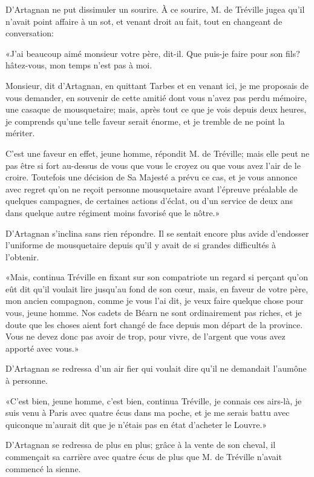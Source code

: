 D'Artagnan ne put dissimuler un sourire. À ce sourire, M. de Tréville jugea qu'il n'avait point affaire à un sot, et venant droit au fait, tout en changeant de conversation: 

«J'ai beaucoup aimé monsieur votre père, dit-il. Que puis-je faire pour son fils? hâtez-vous, mon temps n'est pas à moi. 

\speak  Monsieur, dit d'Artagnan, en quittant Tarbes et en venant ici, je me proposais de vous demander, en souvenir de cette amitié dont vous n'avez pas perdu mémoire, une casaque de mousquetaire; mais, après tout ce que je vois depuis deux heures, je comprends qu'une telle faveur serait énorme, et je tremble de ne point la mériter. 

\speak  C'est une faveur en effet, jeune homme, répondit M. de Tréville; mais elle peut ne pas être si fort au-dessus de vous que vous le croyez ou que vous avez l'air de le croire. Toutefois une décision de Sa Majesté a prévu ce cas, et je vous annonce avec regret qu'on ne reçoit personne mousquetaire avant l'épreuve préalable de quelques campagnes, de certaines actions d'éclat, ou d'un service de deux ans dans quelque autre régiment moins favorisé que le nôtre.» 

D'Artagnan s'inclina sans rien répondre. Il se sentait encore plus avide d'endosser l'uniforme de mousquetaire depuis qu'il y avait de si grandes difficultés à l'obtenir. 

«Mais, continua Tréville en fixant sur son compatriote un regard si perçant qu'on eût dit qu'il voulait lire jusqu'au fond de son cœur, mais, en faveur de votre père, mon ancien compagnon, comme je vous l'ai dit, je veux faire quelque chose pour vous, jeune homme. Nos cadets de Béarn ne sont ordinairement pas riches, et je doute que les choses aient fort changé de face depuis mon départ de la province. Vous ne devez donc pas avoir de trop, pour vivre, de l'argent que vous avez apporté avec vous.» 

D'Artagnan se redressa d'un air fier qui voulait dire qu'il ne demandait l'aumône à personne. 

«C'est bien, jeune homme, c'est bien, continua Tréville, je connais ces airs-là, je suis venu à Paris avec quatre écus dans ma poche, et je me serais battu avec quiconque m'aurait dit que je n'étais pas en état d'acheter le Louvre.» 

D'Artagnan se redressa de plus en plus; grâce à la vente de son cheval, il commençait sa carrière avec quatre écus de plus que M. de Tréville n'avait commencé la sienne. 

